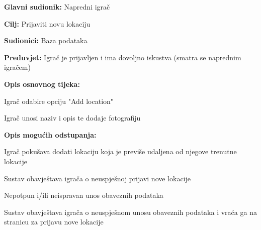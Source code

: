 					\noindent {}
					\begin{packed_item}
	
						\item \textbf{Glavni sudionik: }Napredni igrač
						\item  \textbf{Cilj:} Prijaviti novu lokaciju
						\item  \textbf{Sudionici:} Baza podataka
						\item  \textbf{Preduvjet:} Igrač je prijavljen i ima dovoljno iskustva (smatra se naprednim igračem)
						\item  \textbf{Opis osnovnog tijeka:}
						
						\item[] \begin{packed_enum}
	
							\item Igrač odabire opciju "Add location"
							\item Igrač unosi naziv i opis te dodaje fotografiju

						\end{packed_enum}
						
						\item  \textbf{Opis mogućih odstupanja:}
						
						\item[] \begin{packed_item}
	
							\item[1.a] Igrač pokušava dodati lokaciju koja je previše udaljena od njegove trenutne lokacije
							\item[] \begin{packed_enum}
								
								\item Sustav obavještava igrača o neuspješnoj prijavi nove lokacije
								
							\end{packed_enum}
							
							\item[2.a] Nepotpun i/ili neispravan unos obaveznih podataka
							\item[] \begin{packed_enum}
								
								\item Sustav obavještava igrača o neuspješnom unosu obaveznih podataka i vraća ga na stranicu za prijavu nove lokacije
								
							\end{packed_enum}
							
						\end{packed_item}
					\end{packed_item}
					

